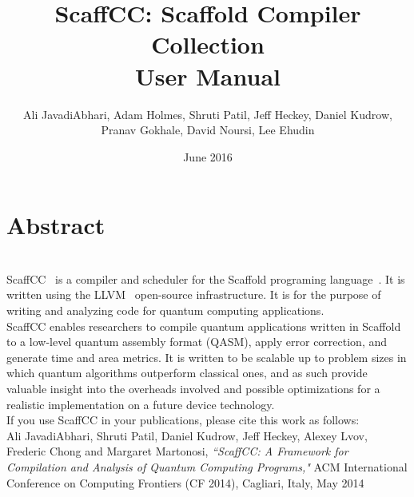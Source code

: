 \documentclass[12pt]{report}
\begin{document}
\title{
    {ScaffCC: Scaffold Compiler Collection}\\
    {\large User Manual}\\
}


\author{Ali JavadiAbhari, Adam Holmes, Shruti Patil, Jeff Heckey, Daniel Kudrow,\\ Pranav Gokhale, David Noursi, Lee Ehudin}

\date{June 2016}



\maketitle

\chapter*{Abstract}
~\\

ScaffCC~\cite{scaffcc} is a compiler and scheduler for the Scaffold programing language~\cite{Scaffold}. It is written using the LLVM~\cite{LLVM} open-source infrastructure. It is for the purpose of writing and analyzing code for quantum computing applications.\\

ScaffCC enables researchers to compile quantum applications written in Scaffold to a low-level quantum assembly format (QASM), apply error correction, and generate time and area metrics. It is written to be scalable up to problem sizes in which quantum algorithms outperform classical ones, and as such provide valuable insight into the overheads involved and possible optimizations for a realistic implementation on a future device technology.\\

If you use ScaffCC in your publications, please cite this work as follows:\\

Ali JavadiAbhari, Shruti Patil, Daniel Kudrow, Jeff Heckey, Alexey Lvov, Frederic Chong and Margaret Martonosi, {\em``ScaffCC: A Framework for Compilation and Analysis of Quantum Computing Programs,"} ACM International Conference on Computing Frontiers (CF 2014), Cagliari, Italy, May 2014

\tableofcontents









\end{document}
